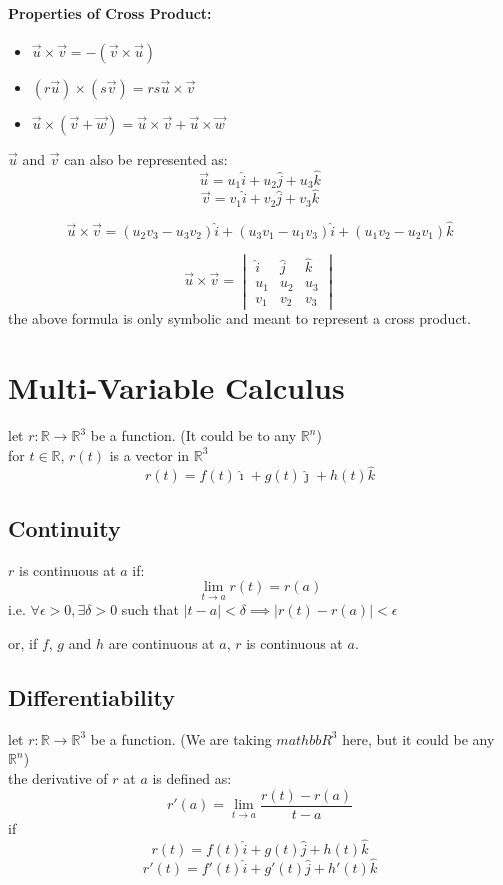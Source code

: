 \documentclass{article}
\begin{document}
\paragraph*{Properties of Cross Product: }
\begin{itemize}
    \item $\vec{u} \times \vec{v} = - (\vec{v} \times \vec{u})$
    \item $(r\vec{u}) \times (s \vec{v}) = rs \vec{u} \times \vec{v}$
    \item $ \vec{u} \times (\vec{v} + \vec{w}) = \vec{u} \times \vec{v} + \vec{u} \times \vec{w}$
\end{itemize}

$\vec{u}$ and $\vec{v}$ can also be represented as: 
\[ \vec{u} = u_1 \hat{i} + u_2 \hat{j} + u_3 \hat{k}\]
\[ \vec{v} = v_1 \hat{i} + v_2 \hat{j} + v_3 \hat{k}\]

\[\vec{u} \times \vec{v} = (u_2 v_3 - u_3 v_2)\hat{i} + (u_3 v_1 - u_1 v_3)\hat{i} + (u_1 v_2 - u_2 v_1)\hat{k}\]

\[\vec{u} \times \vec{v} = \begin{vmatrix}
    \hat{i} & \hat{j} & \hat{k} \\
    u_1 & u_2 & u_3\\
    v_1 & v_2 & v_3
\end{vmatrix}
\]
the above formula is only symbolic and meant to represent a cross product.

\section{Multi-Variable Calculus}

let $r: \mathbb{R} \rightarrow \mathbb{R}^3$ be a function.
(It could be to any $\mathbb{R}^n$)\\
for $t \in \mathbb{R}$, $r(t)$ is a vector in $\mathbb{R}^3$\\
\[r(t) = f(t)\hat{\imath} + g(t)\hat{\jmath} + h(t)\hat{k}\]

\subsection{Continuity}
$r$ is continuous at $a$ if: 
\[\lim_{t \rightarrow a} r(t) = r(a)\]
i.e. $\forall \epsilon > 0, \exists \delta > 0$ such that $|t - a| < \delta \implies |r(t) - r(a)| < \epsilon$

or, if $f$, $g$ and $h$ are continuous at $a$, $r$ is continuous at $a$.

\subsection{Differentiability}
let $r: \mathbb{R} \rightarrow \mathbb{R}^3$ be a function. (We are taking $mathbb{R}^3$ here, but it could be any $\mathbb{R}^n$)\\
the derivative of $r$ at $a$ is defined as:
\[ r'(a) = \lim_{t \rightarrow a} \frac{r(t) - r(a)}{t - a}\]
if 
\[r(t) = f(t)\hat{i} + g(t)\hat{j} + h(t)\hat{k}\]
\[r'(t) = f'(t)\hat{i} + g'(t)\hat{j} + h'(t)\hat{k}\]
\end{document}
